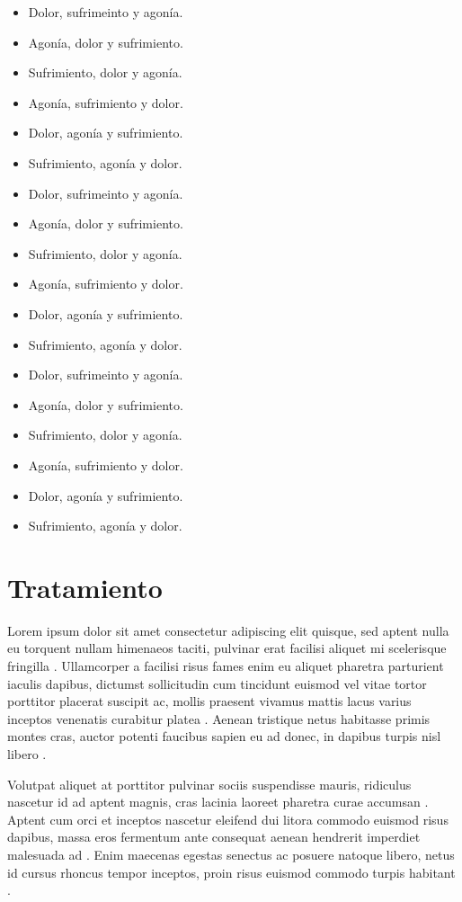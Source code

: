 \documentclass{article}
\begin{document}
        \begin{itemize}
            \item Dolor, sufrimeinto y agonía.
            \item Agonía, dolor y sufrimiento.
            \item Sufrimiento, dolor y agonía.
            \item Agonía, sufrimiento y dolor.
            \item Dolor, agonía y sufrimiento.
            \item Sufrimiento, agonía y dolor.
            \item Dolor, sufrimeinto y agonía.
            \item Agonía, dolor y sufrimiento.
            \item Sufrimiento, dolor y agonía.
            \item Agonía, sufrimiento y dolor.
            \item Dolor, agonía y sufrimiento.
            \item Sufrimiento, agonía y dolor.
            \item Dolor, sufrimeinto y agonía.
            \item Agonía, dolor y sufrimiento.
            \item Sufrimiento, dolor y agonía.
            \item Agonía, sufrimiento y dolor.
            \item Dolor, agonía y sufrimiento.
            \item Sufrimiento, agonía y dolor.
        \end{itemize}
        
\section{Tratamiento}

Lorem ipsum dolor sit amet consectetur adipiscing elit quisque, sed aptent nulla eu torquent nullam himenaeos taciti, pulvinar erat facilisi aliquet mi scelerisque fringilla \cite{C}. Ullamcorper a facilisi risus fames enim eu aliquet pharetra parturient iaculis dapibus, dictumst sollicitudin cum tincidunt euismod vel vitae tortor porttitor placerat suscipit ac, mollis praesent vivamus mattis lacus varius inceptos venenatis curabitur platea \cite{A}. Aenean tristique netus habitasse primis montes cras, auctor potenti faucibus sapien eu ad donec, in dapibus turpis nisl libero \cite{B}.

Volutpat aliquet at porttitor pulvinar sociis suspendisse mauris, ridiculus nascetur id ad aptent magnis, cras lacinia laoreet pharetra curae accumsan \cite{A}. Aptent cum orci et inceptos nascetur eleifend dui litora commodo euismod risus dapibus, massa eros fermentum ante consequat aenean hendrerit imperdiet malesuada ad \cite{B}. Enim maecenas egestas senectus ac posuere natoque libero, netus id cursus rhoncus tempor inceptos, proin risus euismod commodo turpis habitant \cite{C}.
	

\end{document}
